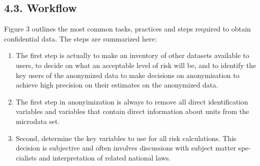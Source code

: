 \documentclass[]{article}
\begin{document}
\newpage
\subsection*{4.3. Workflow}
Figure 3 outlines the most common tasks, practices and steps required to obtain
conﬁdential data. The steps are summarized here:
\begin{enumerate}
\item The ﬁrst step is actually to make an inventory of other datasets available to
users, to decide on what an acceptable level of risk will be, and to identify
the key users of the anonymized data to make decisions on anonymisation to
achieve high precision on their estimates on the anonymized data.
\item The ﬁrst step in anonyimization is always to remove all direct identiﬁcation
variables and variables that contain direct information about units from the
microdata set.
\item  Second, determine the key variables to use for all risk calculations. This
decision is subjective and often involves discussions with subject matter spe-
cialists and interpretation of related national laws. 

%





\end{enumerate}
\end{document}
